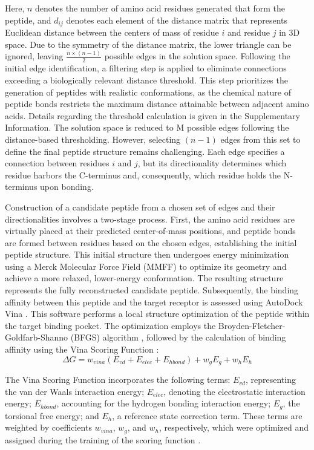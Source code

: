 \vspace{3pt} \noindent
Here, $n$ denotes the number of amino acid residues generated that form the peptide, and $d_{ij}$ denotes each element of the distance matrix that represents Euclidean distance between the centers of mass of residue $i$ and residue $j$ in 3D space. Due to the symmetry of the distance matrix, the lower triangle can be ignored, leaving $\frac{n \times (n-1)}{2}$ possible edges in the solution space. Following the initial edge identification, a filtering step is applied to eliminate connections exceeding a biologically relevant distance threshold. This step prioritizes the generation of peptides with realistic conformations, as the chemical nature of peptide bonds restricts the maximum distance attainable between adjacent amino acids. Details regarding the threshold calculation is given in the Supplementary Information. The solution space is reduced to M possible edges following the distance-based thresholding. However, selecting $(n-1)$ edges from this set to define the final peptide structure remains challenging. Each edge specifies a connection between residues $i$ and $j$, but its directionality determines which residue harbors the C-terminus and, consequently, which residue holds the N-terminus upon bonding. 

\vspace{3pt} \noindent
Construction of a candidate peptide from a chosen set of edges and their directionalities involves a two-stage process. First, the amino acid residues are virtually placed at their predicted center-of-mass positions, and peptide bonds are formed between residues based on the chosen edges, establishing the initial peptide structure. This initial structure then undergoes energy minimization using a Merck Molecular Force Field (MMFF) \cite{halgren1996merck} to optimize its geometry and achieve a more relaxed, lower-energy conformation. The resulting structure represents the fully reconstructed candidate peptide. Subsequently, the binding affinity between this peptide and the target receptor is assessed using AutoDock Vina \cite{trott2010autodock}. This software performs a local structure optimization of the peptide within the target binding pocket. The optimization employs the Broyden-Fletcher-Goldfarb-Shanno (BFGS) algorithm \cite{head1985broyden}, followed by the calculation of binding affinity using the Vina Scoring Function \cite{trott2010autodock}:
$$\Delta G = w_{vina}(E_{vd}+ E_{elec} + E_{hbond}) + w_gE_g + w_hE_h$$

\vspace{3pt} \noindent
The Vina Scoring Function incorporates the following terms: $E_{vd}$, representing the van der Waals interaction energy; $E_{elec}$, denoting the electrostatic interaction energy; $E_{hbond}$, accounting for the hydrogen bonding interaction energy; $E_g$, the torsional free energy; and $E_h$, a reference state correction term. These terms are weighted by coefficients $w_{vina}$, $w_g$, and $w_h$, respectively, which were optimized and assigned during the training of the scoring function \cite{trott2010autodock}.

